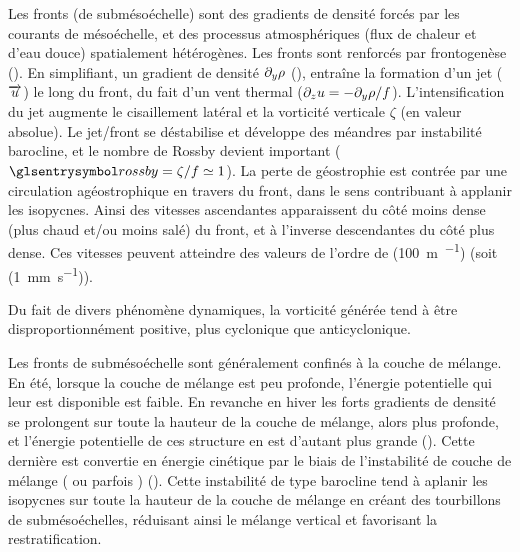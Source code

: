 Les fronts (de submésoéchelle) sont des gradients de densité forcés par les courants de mésoéchelle, et des processus atmosphériques (flux de chaleur et d'eau douce) spatialement hétérogènes.
Les fronts sont renforcés par frontogenèse (\cite{thomas_2008,mcwilliams_2016}).
En simplifiant, un gradient de densité \(\textder{\rho}{y}\) (), entraîne la formation d'un jet (\(\vect{u}\)) le long du front, du fait d'un vent thermal (\(\textder{u}{z} = -\textder{\rho}{y} / f\)).
L'intensification du jet augmente le cisaillement latéral et la vorticité verticale \(\zeta\) (en valeur absolue).
Le jet/front se déstabilise et développe des méandres par instabilité barocline, et le nombre de Rossby devient important (\(\am{rossby} = \zeta / f \simeq 1\)).
La perte de géostrophie est contrée par une circulation agéostrophique en travers du front, dans le sens contribuant à applanir les isopycnes.
Ainsi des vitesses ascendantes apparaissent du côté moins dense (plus chaud et/ou moins salé) du front, et à l'inverse descendantes du côté plus dense.
Ces vitesses peuvent atteindre des valeurs de l'ordre de \OM(\qty{100}{\meter\per\jr}) (soit \OM(\qty{1}{\mm\per\s})).

\begin{note}
  Du fait de divers phénomène dynamiques, la vorticité générée tend à être disproportionnément positive,  plus cyclonique que anticyclonique.
\end{note}

\begin{figure}
  \centering
  \label{fig:frontogenesis}
\end{figure}

Les fronts de submésoéchelle sont généralement confinés à la couche de mélange.
En été, lorsque la couche de mélange est peu profonde, l'énergie potentielle qui leur est disponible est faible.
En revanche en hiver les forts gradients de densité se prolongent sur toute la hauteur de la couche de mélange, alors plus profonde, et l'énergie potentielle de ces structure en est d'autant plus grande (\cite{mensa_2013,callies_2015,buckingham_2016,sasaki_2020}).
Cette dernière est convertie en énergie cinétique par le biais de l'instabilité de couche de mélange ( ou parfois ) (\cite{boccaletti_2007,fox-kemper_2008}).
Cette instabilité de type barocline tend à aplanir les isopycnes sur toute la hauteur de la couche de mélange en créant des tourbillons de submésoéchelles, réduisant ainsi le mélange vertical et favorisant la restratification.

